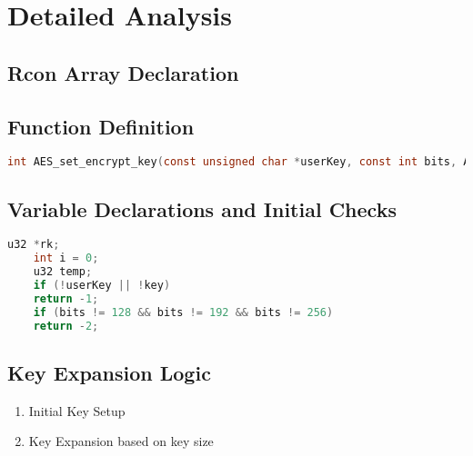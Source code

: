 \section{Detailed Analysis}
\subsection{Rcon Array Declaration}


\subsection{Function Definition}
\begin{lstlisting}[language=C]
	int AES_set_encrypt_key(const unsigned char *userKey, const int bits, AES_KEY *key);
\end{lstlisting}

\subsection{Variable Declarations and Initial Checks}
\begin{lstlisting}[language=C]
	u32 *rk;
	int i = 0;
	u32 temp;
	if (!userKey || !key)
	return -1;
	if (bits != 128 && bits != 192 && bits != 256)
	return -2;
\end{lstlisting}

\subsection{Key Expansion Logic}
\begin{enumerate}
	\item Initial Key Setup
	\item Key Expansion based on key size
\end{enumerate}

